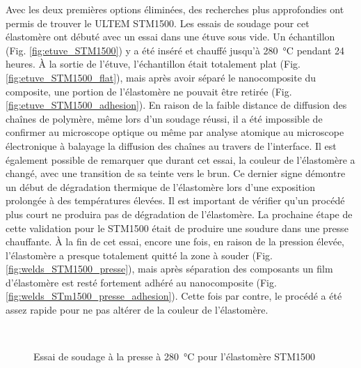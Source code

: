 Avec les deux premières options éliminées, des recherches plus approfondies ont permis de trouver le ULTEM STM1500. 
Les essais de soudage pour cet élastomère ont débuté avec un essai dans une étuve sous vide. 
Un échantillon (Fig. \ref{fig:etuve_STM1500}) y a été inséré et chauffé jusqu'à \SI{280}{\celsius} pendant 24 heures. 
À la sortie de l'étuve, l'échantillon était totalement plat (Fig. \ref{fig:etuve_STM1500_flat}), mais après avoir séparé le nanocomposite du composite, une portion de l'élastomère ne pouvait être retirée (Fig. \ref{fig:etuve_STM1500_adhesion}). 
En raison de la faible distance de diffusion des chaînes de polymère, même lors d'un soudage réussi, il a été impossible de confirmer au microscope optique ou même par analyse atomique au microscope électronique à balayage la diffusion des chaînes au travers de l'interface. 
Il est également possible de remarquer que durant cet essai, la couleur de l'élastomère a changé, avec une transition de sa teinte vers le brun.  
Ce dernier signe démontre un début de dégradation thermique de l'élastomère lors d'une exposition prolongée à des températures élevées. 
Il est important de vérifier qu'un procédé plus court ne produira pas de dégradation de l'élastomère. 
La prochaine étape de cette validation pour le STM1500 était de produire une soudure dans une presse chauffante. 
À la fin de cet essai, encore une fois, en raison de la pression élevée, l'élastomère a presque totalement quitté la zone à souder (Fig. \ref{fig:welds_STM1500_presse}), mais après séparation des composants un film d'élastomère est resté fortement adhéré au nanocomposite (Fig. \ref{fig:welds_STm1500_presse_adhesion}). 
Cette fois par contre, le procédé a été assez rapide pour ne pas altérer de la couleur de l'élastomère. 

\begin{figure}[h]
	\centering
	 \\ 
	 \qquad
	\caption{Essai de soudage dans une étuve sous vide à \SI{280}{\celsius} pour l'élastomère STM1500}
	\label{fig:etuve_STM1500}
	
	\centering
	 \qquad
	\caption{Essai de soudage à la presse à \SI{280}{\celsius} pour l'élastomère STM1500}
	\label{fig:presse_STM1500}
\end{figure}

